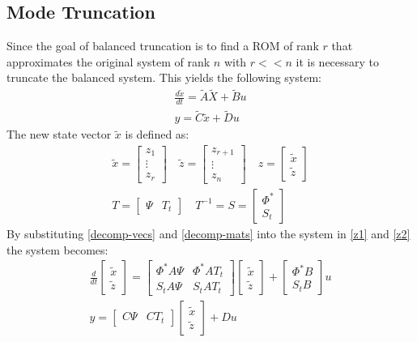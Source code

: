 \subsection{Mode Truncation}
Since the goal of balanced truncation is to find a ROM of rank \(r\) that approximates the original system of rank \(n\) with \(r << n\) it is necessary to truncate the balanced system.
This yields the following system:
\begin{gather}
\frac{d\tilde{x}}{dt} = \tilde{A}\tilde{X} + \tilde{B}u \\
y = \tilde{C}\tilde{x} + \tilde{D}u
\end{gather}
The new state vector \(\tilde{x}\) is defined as:
\begin{gather}
\tilde{x} = \begin{bmatrix}
z_1 \\
\vdots \\
z_r
\end{bmatrix} \quad 
\tilde{z} = \begin{bmatrix}
z_{r+1} \\
\vdots \\
z_n
\end{bmatrix} \quad
z = \begin{bmatrix}
\tilde{x} \\
\tilde{z}
\end{bmatrix} \label{decomp-vecs}\\
T = \begin{bmatrix}
\Psi & T_t
\end{bmatrix} \quad
T^{-1} = S = \begin{bmatrix}
\Phi^{*} \\
S_t
\end{bmatrix} \label{decomp-mats}
\end{gather}
By substituting \ref{decomp-vecs} and \ref{decomp-mats} into the system in \ref{z1} and \ref{z2} the system becomes:
\begin{gather}
\frac{d}{dt} \begin{bmatrix}
\tilde{x} \\
\tilde{z}
\end{bmatrix} = \begin{bmatrix}
\Phi^{*}A\Psi & \Phi^{*}AT_t \\
S_tA\Psi & S_tAT_t
\end{bmatrix} \begin{bmatrix}
\tilde{x} \\
\tilde{z}
\end{bmatrix}
+ \begin{bmatrix}
\Phi^{*}B \\
S_tB
\end{bmatrix} u \\
y = \begin{bmatrix}
C \Psi & CT_t
\end{bmatrix} \begin{bmatrix}
\tilde{x} \\
\tilde{z}
\end{bmatrix} + Du
\end{gather}
